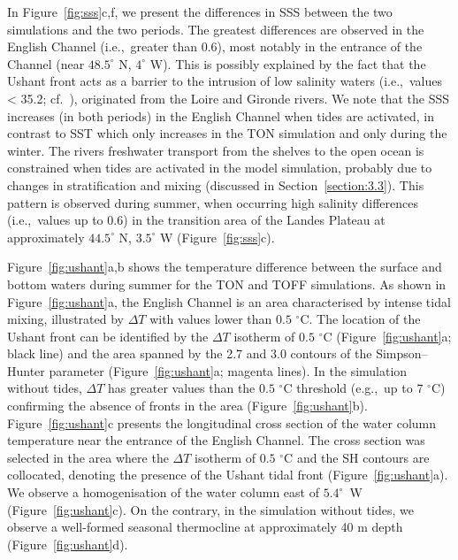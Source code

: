 \documentclass[jmse,article,accept,moreauthors,pdftex]{Definitions/mdpi}
\begin{document}
In Figure~\ref{fig:sss}c,f, we present the differences in SSS between the two simulations and the two periods. The greatest differences are observed in the English Channel (i.e.,~greater than 0.6), most notably in the entrance of the Channel (near $48.5^\circ$ N, $4^\circ$ W). This is possibly explained by the fact that the Ushant front acts as a barrier to the intrusion of low salinity waters (i.e.,~values < 35.2; cf.~\cite{Kelly-Gerreyn2006}), originated from the Loire and Gironde rivers. We note that the SSS increases (in both periods) in the English Channel when tides are activated, in contrast to SST which only increases in the TON simulation and only during the winter. The rivers freshwater transport from the shelves to the open ocean is constrained when tides are activated in the model simulation, probably due to changes in stratification and mixing (discussed in Section~\ref{section:3.3}). This pattern is observed during summer, when occurring high salinity differences (i.e.,~values up to 0.6) in the transition area of the Landes Plateau at approximately $44.5^\circ$ N, $3.5^\circ$ W (Figure~\ref{fig:sss}c).

Figure~\ref{fig:ushant}a,b shows the temperature difference between the surface and bottom waters during summer for the TON and TOFF simulations. As shown in Figure~\ref{fig:ushant}a, the English Channel is an area characterised by intense tidal mixing, illustrated by $\Delta T$ with values lower than $0.5$ $^\circ$C. The location of the Ushant front can be identified by the $\Delta T$ isotherm of $0.5$ $^\circ$C (Figure~\ref{fig:ushant}a; black line) and the area spanned by the 2.7 and 3.0 contours of the Simpson--Hunter parameter (Figure~\ref{fig:ushant}a; magenta lines). In the simulation without tides, $\Delta T$ has greater values than the $0.5$ $^\circ$C threshold (e.g.,~up to $7$ $^\circ$C) confirming the absence of fronts in the area (Figure~\ref{fig:ushant}b). Figure~\ref{fig:ushant}c presents the longitudinal cross section of the water column temperature near the entrance of the English Channel. The cross section was selected in the area where the $\Delta T$ isotherm of $0.5$ $^\circ$C and the SH contours are collocated, denoting the presence of the Ushant tidal front (Figure~\ref{fig:ushant}a). We observe a homogenisation of the water column east of $5.4^\circ$~W (Figure~\ref{fig:ushant}c). On the contrary, in the simulation without tides, we observe a well-formed seasonal thermocline at approximately 40 m depth (Figure~\ref{fig:ushant}d).
\end{document}
